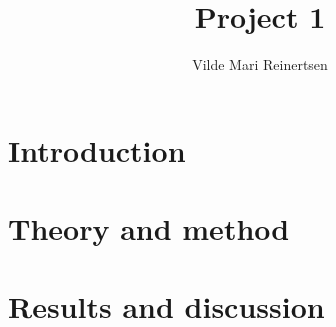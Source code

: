 \documentclass[a4paper,12pt]{article}
\date{}
\author{Vilde Mari Reinertsen}
\title{Project 1}
\begin{document}
\begingroup
\let\center\flushleft
\let\endcenter\endflushleft
\maketitle
\endgroup

\tableofcontents

\section{Introduction}


\section{Theory and method}


\section{Results and discussion}


\begin{appendices}

\end{appendices}


\newpage

\end{document}
